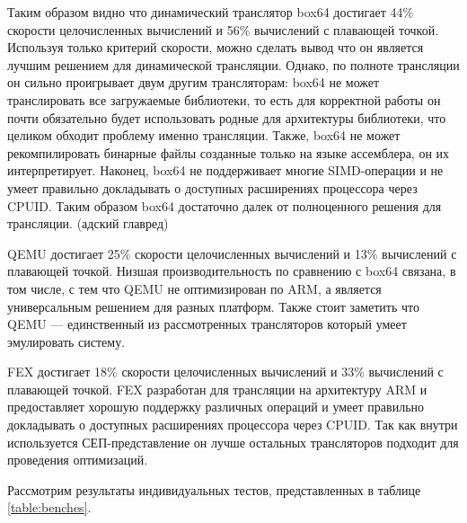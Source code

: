 Таким образом видно что динамический транслятор box64 достигает 44\% скорости целочисленных вычислений и 56\% вычислений с плавающей точкой. Используя только критерий скорости, можно сделать вывод что он является лучшим решением для динамической трансляции. Однако, по полноте трансляции он сильно проигрывает двум другим трансляторам: box64 не может транслировать все загружаемые библиотеки, то есть для корректной работы он почти обязательно будет использовать родные для архитектуры библиотеки, что целиком обходит проблему именно трансляции. Также, box64 не может рекомпилировать бинарные файлы созданные только на языке ассемблера, он их интерпретирует. Наконец, box64 не поддерживает многие SIMD-операции и не умеет правильно докладывать о доступных расширениях процессора через CPUID. Таким образом box64 достаточно далек от полноценного решения для трансляции. (адский главред)

QEMU достигает 25\% скорости целочисленных вычислений и 13\% вычислений с плавающей точкой. Низшая производительность по сравнению с box64 связана, в том числе, с тем что QEMU не оптимизирован по ARM, а является универсальным решением для разных платформ. Также стоит заметить что QEMU --- единственный из рассмотренных трансляторов который умеет эмулировать систему.

FEX достигает 18\% скорости целочисленных вычислений и 33\% вычислений с плавающей точкой. FEX разработан для трансляции на архитектуру ARM и предоставляет хорошую поддержку различных операций и умеет правильно докладывать о доступных расширениях процессора через CPUID. Так как внутри используется СЕП-представление он лучше остальных трансляторов подходит для проведения оптимизаций. 

Рассмотрим результаты индивидуальных тестов, представленных в таблице \ref{table:benches}.

